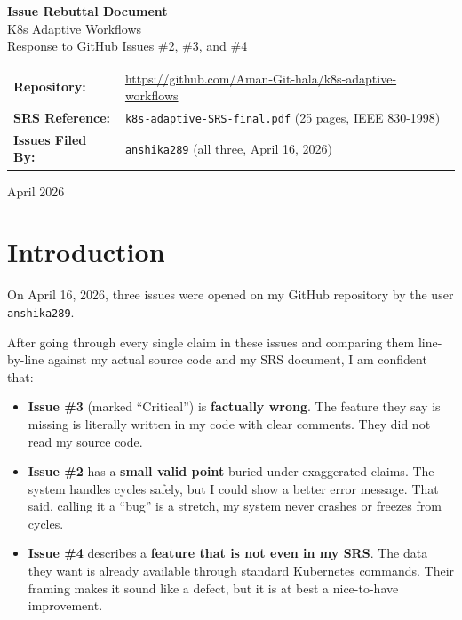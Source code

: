 \documentclass[12pt,a4paper]{article}
\begin{document}
\begin{titlepage}
\centering
\vspace*{2cm}
{\Huge\bfseries Issue Rebuttal Document}\\[0.8cm]
{\LARGE K8s Adaptive Workflows}\\[0.5cm]
{\large Response to GitHub Issues \#2, \#3, and \#4}\\[2cm]

{\large
\begin{tabular}{ll}
\textbf{Repository:} & \url{https://github.com/Aman-Git-hala/k8s-adaptive-workflows} \\[0.3cm]
\textbf{SRS Reference:} & \texttt{k8s-adaptive-SRS-final.pdf} (25 pages, IEEE 830-1998) \\[0.3cm]
\textbf{Issues Filed By:} & \texttt{anshika289} (all three, April 16, 2026) \\[0.3cm]
\end{tabular}
}

\vspace{2cm}

\vfill
{\large April 2026}
\end{titlepage}

\tableofcontents
\newpage

\section{Introduction}

On April 16, 2026, three issues were opened on my GitHub repository by the user \texttt{anshika289}. 

After going through every single claim in these issues and comparing them line-by-line against my actual source code and my SRS document, I am confident that:

\begin{itemize}
  \item \textbf{Issue \#3} (marked ``Critical'') is \textbf{factually wrong}. The feature they say is missing is literally written in my code with clear comments. They did not read my source code.
  \item \textbf{Issue \#2} has a \textbf{small valid point} buried under exaggerated claims. The system handles cycles safely, but I could show a better error message. That said, calling it a ``bug'' is a stretch, my system never crashes or freezes from cycles.
  \item \textbf{Issue \#4} describes a \textbf{feature that is not even in my SRS}. The data they want is already available through standard Kubernetes commands. Their framing makes it sound like a defect, but it is at best a nice-to-have improvement.
\end{itemize}
\end{document}
